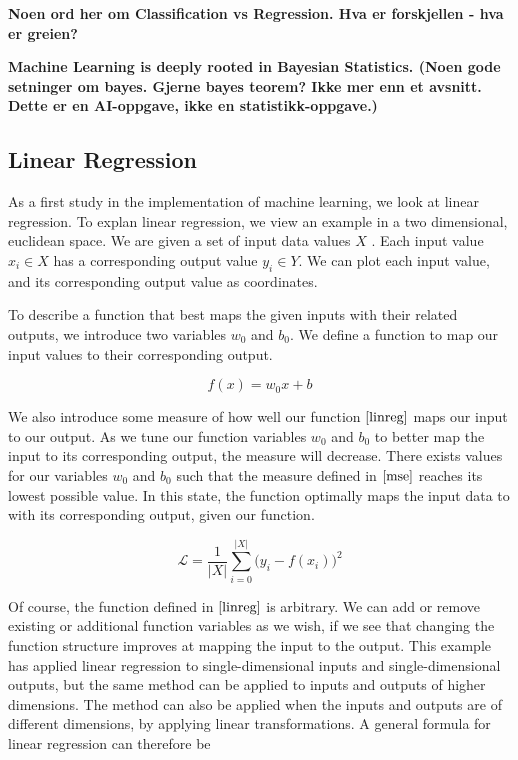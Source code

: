 \textbf{Noen ord her om Classification vs Regression. Hva er forskjellen - hva er greien?}


\textbf{Machine Learning is deeply rooted in Bayesian Statistics. (Noen gode setninger om bayes. Gjerne bayes teorem? Ikke mer enn et avsnitt. Dette er en AI-oppgave, ikke en statistikk-oppgave.)}


\subsection{Linear Regression}

As a first study in the implementation of machine learning, we look at linear regression.
To explan linear regression, we view an example in a two dimensional, euclidean space.
We are given a set of input data values $ X $ . Each input value $ x_i \in X $ has a corresponding output value $ y_i \in Y $.
We can plot each input value, and its corresponding output value as coordinates.


To describe a function that best maps the given inputs with their related outputs, 
we introduce two variables $ w_0 $ and $ b_0 $. We define a function to map our input values to their corresponding output.

\[
        f(x) = w_0x + b \tag{2.1} \label{linreg}
\]

We also introduce some measure of how well our function $ \eqref{linreg} $
maps our input to our output. As we tune our function variables $ w_0 $ and $ b_0 $ to better map the input to its corresponding output,
the measure will decrease. There exists values for our variables $ w_0 $ and $ b_0 $  such that the measure defined in $ \eqref{mse} $ reaches its lowest possible value.
In this state, the function optimally maps the input data to with its corresponding output, given our function.

\[
    \mathcal{L} = \frac{1}{|X|}\sum_{i = 0}^{|X|} \big(y_i - f(x_i)\big)^2 \tag{2.2} \label{func:mse}
\]

Of course, the function defined in $ \eqref{linreg} $ is arbitrary. 
We can add or remove existing or additional function variables as we wish,
if we see that changing the function structure improves at mapping the input to the output.
This example has applied linear regression to single-dimensional inputs and single-dimensional outputs,
but the same method can be applied to inputs and outputs of higher dimensions.
The method can also be applied when the inputs and outputs are of different dimensions, by applying linear transformations.
A general formula for linear regression can therefore be 



